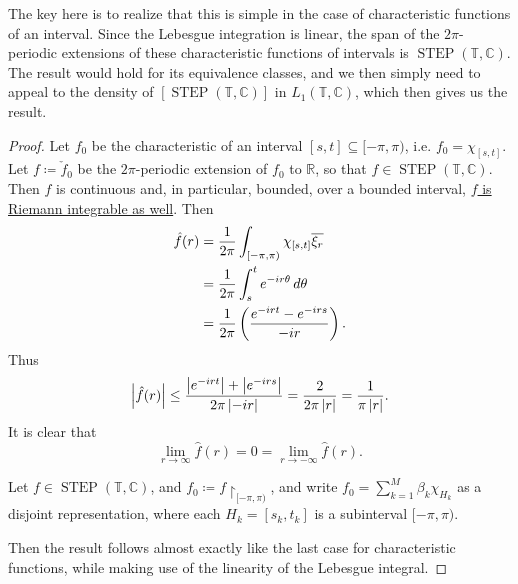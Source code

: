 \documentclass[notoc,notitlepage]{tufte-book}
\DeclareMathOperator{\STEP}{STEP}
\begin{document}
\begin{strategy}
  The key here is to realize that this is simple in the case of characteristic
  functions of an interval.
  Since the Lebesgue integration is linear, the span of the $2 \pi$-periodic
  extensions of these characteristic functions of intervals is
  $\STEP(\mathbb{T}, \mathbb{C})$.
  The result would hold for its equivalence classes,
  and we then simply need to appeal to the density of
  $[\STEP(\mathbb{T}, \mathbb{C})]$ in $L_1(\mathbb{T}, \mathbb{C})$,
  which then gives us the result.
\end{strategy}

\begin{proof}
  Let $f_0$ be the characteristic of an interval $[s, t] \subseteq [-\pi, \pi)$,
  i.e. $f_0 = \chi_{[s, t]}$.
  Let $f \coloneqq \check{f}_0$ be the $2 \pi$-periodic extension
  of $f_0$ to $\mathbb{R}$, so that $f \in \STEP(\mathbb{T}, \mathbb{C})$.
  Then $f$ is continuous and, in particular, bounded, over a bounded interval,
  \hyperref[thm:bounded_riemann_integrable_functions_are_lebesgue_integrable]{
  $f$ is Riemann integrable as well}.
  Then
  \begin{align*}
    \hat{f}(r)
    &= \frac{1}{2 \pi} \int_{[-\pi, \pi)} \chi_{[s, t]} \overline{\xi_r} \\
    &= \frac{1}{2 \pi} \int_{s}^{t} e^{-ir \theta} \mathop{}\!d{\theta} \\
    &= \frac{1}{2 \pi} \left( \frac{e^{-ir t} - e^{-ir s}}{-ir} \right).
  \end{align*}
  Thus
  \begin{equation*}
    \left|\hat{f}(r)\right|
    \leq \frac{\left|e^{-irt}\right| + \left|e^{-irs}\right|}{2 \pi \left|-ir\right|} 
    = \frac{2}{2 \pi \left|r\right|} = \frac{1}{\pi \left|r\right|}.
  \end{equation*}
  It is clear that
  \begin{equation*}
    \lim_{r \to \infty} \hat{f}(r) = 0 = \lim_{r \to -\infty} \hat{f}(r).
  \end{equation*}

  \noindent
  Let $f \in \STEP(\mathbb{T}, \mathbb{C})$,
  and $f_0 \coloneqq f \restriction_{[-\pi, \pi)}$, and write
  $f_0 = \sum_{k=1}^{M} \beta_k \chi_{H_k}$ as a disjoint representation,
  where each $H_k = [s_k, t_k]$ is a subinterval $[-\pi, \pi)$.

  Then the result follows almost exactly like the last case for
  characteristic functions, while making use of the linearity of
  the Lebesgue integral.


\end{proof}
\end{document}
